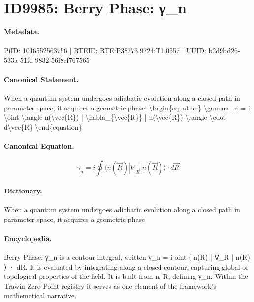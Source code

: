 \section*{ID9985: Berry Phase: γ\_n}
\paragraph{Metadata.}
PiID: 1016552563756 | RTEID: RTE:P38773.9724:T1.0557 | UUID: b2d9bd26-533a-51fd-9832-56f8cf767565

\paragraph{Canonical Statement.}
When a quantum system undergoes adiabatic evolution along a closed path in parameter space, it acquires a geometric phase: \textbackslash{}begin\{equation\} \textbackslash{}gamma\_n = i \textbackslash{}oint \textbackslash{}langle n(\textbackslash{}vec\{R\}) | \textbackslash{}nabla\_\{\textbackslash{}vec\{R\}\} | n(\textbackslash{}vec\{R\}) \textbackslash{}rangle \textbackslash{}cdot d\textbackslash{}vec\{R\} \textbackslash{}end\{equation\}

\paragraph{Canonical Equation.}
\[
\gamma_n = i \oint \langle n(\vec{R}) | \nabla_{\vec{R}} | n(\vec{R}) \rangle \cdot d\vec{R}
\]

\paragraph{Dictionary.}
When a quantum system undergoes adiabatic evolution along a closed path in parameter space, it acquires a geometric phase

\paragraph{Encyclopedia.}
Berry Phase: γ\_n is a contour integral, written γ\_n = i oint ⟨ n(R) | ∇\_R | n(R) ⟩ · dR. It is evaluated by integrating along a closed contour, capturing global or topological properties of the field. It is built from n, R, defining γ\_n. Within the Trawin Zero Point registry it serves as one element of the framework's mathematical narrative.
